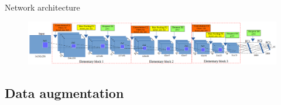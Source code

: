 \documentclass[10pt]{beamer}
\begin{document}
\begin{frame}{Network architecture}{}
{    		\begin{center}
     			\begin{figure}[htbp]
        			\centering
        			\includegraphics[scale=.2]{images/arch_model}
				\end{figure}
     		\end{center}
     		
		}
\end{frame}
\subsection{Data augmentation}
\end{document}
